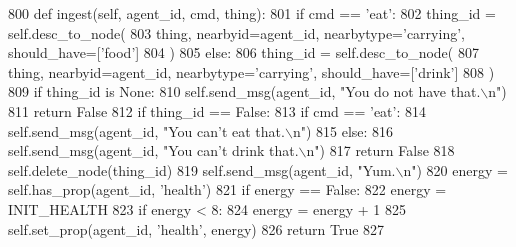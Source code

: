 \begin{DoxyCode}
800     \textcolor{keyword}{def }ingest(self, agent\_id, cmd, thing):
801         \textcolor{keywordflow}{if} cmd == \textcolor{stringliteral}{'eat'}:
802             thing\_id = self.desc\_to\_node(
803                 thing, nearbyid=agent\_id, nearbytype=\textcolor{stringliteral}{'carrying'}, should\_have=[\textcolor{stringliteral}{'food'}]
804             )
805         \textcolor{keywordflow}{else}:
806             thing\_id = self.desc\_to\_node(
807                 thing, nearbyid=agent\_id, nearbytype=\textcolor{stringliteral}{'carrying'}, should\_have=[\textcolor{stringliteral}{'drink'}]
808             )
809         \textcolor{keywordflow}{if} thing\_id \textcolor{keywordflow}{is} \textcolor{keywordtype}{None}:
810             self.send\_msg(agent\_id, \textcolor{stringliteral}{"You do not have that.\(\backslash\)n"})
811             \textcolor{keywordflow}{return} \textcolor{keyword}{False}
812         \textcolor{keywordflow}{if} thing\_id == \textcolor{keyword}{False}:
813             \textcolor{keywordflow}{if} cmd == \textcolor{stringliteral}{'eat'}:
814                 self.send\_msg(agent\_id, \textcolor{stringliteral}{"You can't eat that.\(\backslash\)n"})
815             \textcolor{keywordflow}{else}:
816                 self.send\_msg(agent\_id, \textcolor{stringliteral}{"You can't drink that.\(\backslash\)n"})
817             \textcolor{keywordflow}{return} \textcolor{keyword}{False}
818         self.delete\_node(thing\_id)
819         self.send\_msg(agent\_id, \textcolor{stringliteral}{"Yum.\(\backslash\)n"})
820         energy = self.has\_prop(agent\_id, \textcolor{stringliteral}{'health'})
821         \textcolor{keywordflow}{if} energy == \textcolor{keyword}{False}:
822             energy = INIT\_HEALTH
823         \textcolor{keywordflow}{if} energy < 8:
824             energy = energy + 1
825         self.set\_prop(agent\_id, \textcolor{stringliteral}{'health'}, energy)
826         \textcolor{keywordflow}{return} \textcolor{keyword}{True}
827 
\end{DoxyCode}
\mbox{\label{classprojects_1_1mastering__the__dungeon_1_1tasks_1_1graph__world2_1_1graph_1_1Graph_a3f929c89e9ca47b66c8851490a518f5e}} 
